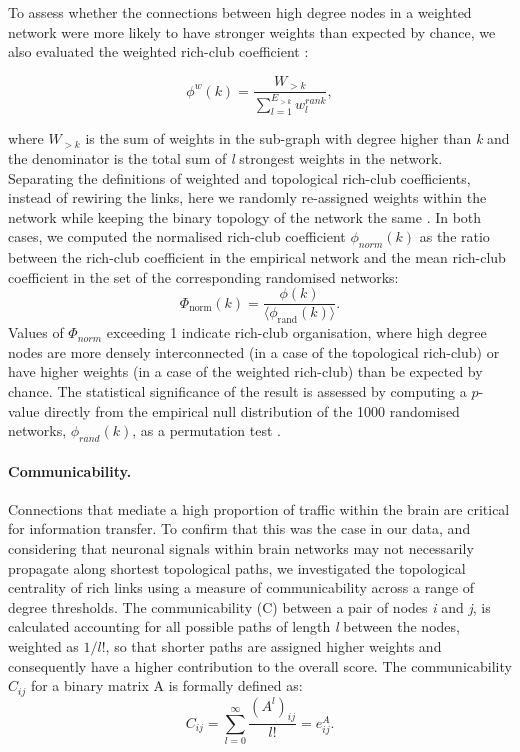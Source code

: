 To assess whether the connections between high degree nodes in a weighted network were more likely to have stronger weights than expected by chance, we also evaluated the weighted rich-club coefficient \citep{Opsahl2008}:

\begin{equation}
    \label{eqn:Ch5Eq2}
    \phi^{w}(k) = \frac{W_{>k}}{\sum_{l=1}^{E_{>k}}w^{rank}_{l}},
\end{equation}

where $W_{>k}$ is the sum of weights in the sub-graph with degree higher than \textit{k} and the denominator is the total sum of \textit{l} strongest weights in the network. Separating the definitions of weighted and topological rich-club coefficients, instead of rewiring the links, here we randomly re-assigned weights within the network while keeping the binary topology of the network the same \citep{Alstott2014}. In both cases, we computed the normalised rich-club coefficient $\phi_{norm}(k)$ as the ratio between the rich-club coefficient in the empirical network and the mean rich-club coefficient in the set of the corresponding randomised networks:
\begin{equation}
    \label{eqn:Ch5Eq3}
    \Phi_\mathrm{norm}(k) = \frac{\phi(k)}{\langle \phi_\mathrm{rand}(k) \rangle}.
\end{equation}
Values of $\Phi_{norm}$ exceeding 1 indicate rich-club organisation, where high degree nodes are more densely interconnected (in a case of the topological rich-club) or have higher weights (in a case of the weighted rich-club) than be expected by chance. The statistical significance of the result is assessed by computing a $p$-value directly from the empirical null distribution of the 1000 randomised networks, $\phi_{rand}(k)$, as a permutation test \citep{VandenHeuvel2011}.

\paragraph*{Communicability.}

Connections that mediate a high proportion of traffic within the brain are critical for information transfer. To confirm that this was the case in our data, and considering that neuronal signals within brain networks may not necessarily propagate along shortest topological paths, we investigated the topological centrality of rich links using a measure of communicability \citep{Estrada2008} across a range of degree thresholds. The communicability (C) between a pair of nodes \textit{i} and \textit{j}, is calculated accounting for all possible paths of length \textit{l} between the nodes, weighted as $1/l!$, so that shorter paths are assigned higher weights and consequently have a higher contribution to the overall score. The communicability $C_{ij}$ for a binary matrix A is formally defined as:
\begin{equation}
    \label{eqn:Ch5Eq4}
    C_{ij}= \sum_{l=0}^{\infty}\frac{(A^{l})_{ij}}{l!} = e^{A}_{ij}.
\end{equation}

